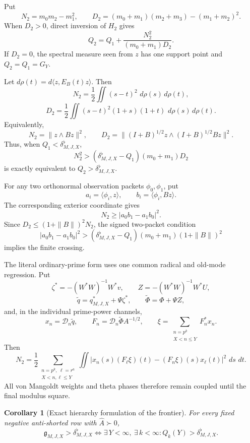 \documentclass[11pt]{amsart}
\newtheorem{corollary}[theorem]{Corollary}
\theoremstyle{definition}
\theoremstyle{remark}
\newcommand{\dd}{\,d}
\begin{document}
Put
\[
 N_2=m_0m_2-m_1^2,\qquad
 D_2=(m_0+m_1)(m_2+m_3)-(m_1+m_2)^2 .
\tag{9.25ay}
\]
When \(D_2>0\), direct inversion of \(H_2\) gives
\[
 \boxed{
 Q_2=Q_1+\frac{N_2^2}{(m_0+m_1)D_2}.}
\tag{9.25az}
\]
If \(D_2=0\), the spectral measure seen from \(z\) has one support point
and \(Q_2=Q_1=G_Y\).

Let \(d\rho(t)=d\langle z,E_B(t)z\rangle\).  Then
\[
 \boxed{
 N_2=\frac12\iint(s-t)^2\,\dd\rho(s)\dd\rho(t),}
\]
\[
 \boxed{
 D_2=\frac12\iint
 (s-t)^2(1+s)(1+t)\,\dd\rho(s)\dd\rho(t).}
\tag{9.25ba}
\]
Equivalently,
\[
 N_2=\|z\wedge Bz\|^2,\qquad
 D_2=\|(I+B)^{1/2}z\wedge(I+B)^{1/2}Bz\|^2 .
\tag{9.25bb}
\]
Thus, when \(Q_1<\delta^{\flat}_{M,J,X}\),
\[
 \boxed{
 N_2^2>
 (\delta^{\flat}_{M,J,X}-Q_1)(m_0+m_1)D_2}
\tag{9.25bc}
\]
is exactly equivalent to \(Q_2>\delta^{\flat}_{M,J,X}\).

For any two orthonormal observation packets \(\phi_0,\phi_1\), put
\[
 a_i=\langle\phi_i,z\rangle,\qquad
 b_i=\langle\phi_i,Bz\rangle .
\]
The corresponding exterior coordinate gives
\[
 N_2\ge|a_0b_1-a_1b_0|^2.                       \tag{9.25bd}
\]
Since \(D_2\le(1+\|B\|)^2N_2\), the signed two-packet condition
\[
 \boxed{
 |a_0b_1-a_1b_0|^2>
 (\delta^{\flat}_{M,J,X}-Q_1)(m_0+m_1)(1+\|B\|)^2}
\tag{9.25be}
\]
implies the finite crossing.

The literal ordinary-prime form uses one common radical and old-mode
regression.  Put
\[
 \zeta^*=-(W^*W)^{-1}W^*v,\qquad
 Z=-(W^*W)^{-1} W^*U,
\]
\[
 \widetilde q=q_{M,J,X}^*+\Psi\zeta^*,\qquad
 \widetilde\Phi=\Phi+\Psi Z,
\]
and, in the individual prime-power channels,
\[
 x_n=\mathcal D_n\widetilde q,\qquad
 F_n=\mathcal D_n\widetilde\Phi A^{-1/2},\qquad
 \xi=\sum_{\substack{n=p^k\\X<n\le Y}}F_n^*x_n .
\tag{9.25bf}
\]
Then
\[
 \boxed{
 N_2=\frac12
 \sum_{\substack{n=p^k,\ \ell=r^a\\X<n,\ell\le Y}}\iint
 \left|x_n(s)(F_\ell\xi)(t)
 -(F_n\xi)(s)x_\ell(t)\right|^2\,\dd s\,\dd t.}
\tag{9.25bg}
\]
All von Mangoldt weights and theta phases therefore remain coupled until
the final modulus square.

\begin{corollary}[Exact hierarchy formulation of the frontier]
\label{cor:krylov-frontier}
For every fixed negative anti-shorted row with \(\widehat A\succ0\),
\[
 \boxed{
 \mathfrak g_{M,J,X}>\delta^{\flat}_{M,J,X}
 \Longleftrightarrow
 \exists\,Y<\infty,\ \exists\,k<\infty:
 Q_k(Y)>\delta^{\flat}_{M,J,X}.}
\tag{9.25bh}
\]
\end{corollary}
\end{document}
